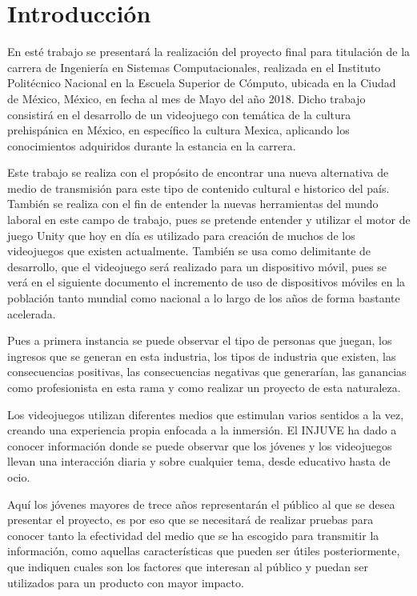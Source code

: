 \chapter{Introducción}


En esté trabajo se presentará la realización del proyecto final para titulación de la carrera de Ingeniería
en Sistemas Computacionales, realizada en el Instituto Politécnico Nacional en la Escuela Superior de Cómputo, 
ubicada en la Ciudad de México, México, en fecha al mes de Mayo del año 2018. Dicho trabajo consistirá 
en el desarrollo de un videojuego con temática de la cultura prehispánica en México, 
en específico la cultura Mexica, aplicando los conocimientos adquiridos durante la estancia en la carrera. 

Este trabajo se realiza con el propósito de encontrar una nueva alternativa de medio de transmisión para este 
tipo de contenido cultural e historico del país. También se realiza con el fin de entender la nuevas herramientas 
del mundo laboral en este campo de trabajo, pues se pretende entender y utilizar el motor de juego Unity 
que hoy en día es utilizado para creación de muchos de los videojuegos que existen actualmente. 
También se usa como delimitante de desarrollo, que el videojuego será realizado para un dispositivo móvil, 
pues se verá en el siguiente documento el incremento de uso de dispositivos móviles en la población 
tanto mundial como nacional a lo largo de los años de forma bastante acelerada.	 

Pues a primera instancia se puede observar el tipo de personas que juegan, 
los ingresos que se generan en esta industria, los tipos de industria que existen, 
las consecuencias positivas, las consecuencias negativas que generarían, 
las ganancias como profesionista en esta rama y como realizar un proyecto de esta naturaleza.

Los videojuegos utilizan diferentes medios que estimulan varios sentidos a la vez, creando una experiencia propia
enfocada a la inmersión. El INJUVE \cite{injuveespana2005} ha dado a conocer información donde se puede observar que los
jóvenes y los videojuegos llevan una interacción diaria y sobre cualquier tema, desde educativo hasta de ocio.

Aquí los jóvenes mayores de trece años representarán el público al que se desea presentar el proyecto, es por eso que se necesitará de realizar 
pruebas para conocer tanto la efectividad del medio que se ha escogido para transmitir la información, 
como aquellas características que pueden ser útiles posteriormente, que indiquen cuales son los factores 
que interesan al público y puedan ser utilizados para un producto con mayor impacto.

